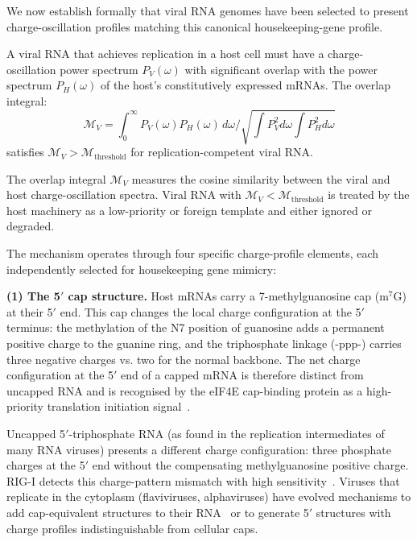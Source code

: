 We now establish formally that viral RNA genomes have been selected to present charge-oscillation profiles matching this canonical housekeeping-gene profile.

\begin{proposition}
\label{v:prop:mimicry}
A viral RNA that achieves replication in a host cell must have a charge-oscillation power spectrum $P_V(\omega)$ with significant overlap with the power spectrum $P_H(\omega)$ of the host's constitutively expressed mRNAs. The overlap integral:
\begin{equation}
  \mathcal{M}_V = \int_0^\infty P_V(\omega) P_H(\omega)\,d\omega \bigg/ \sqrt{\int P_V^2 d\omega \int P_H^2 d\omega}
  \label{v:eq:overlap}
\end{equation}
satisfies $\mathcal{M}_V > \mathcal{M}_{\mathrm{threshold}}$ for replication-competent viral RNA.
\end{proposition}

The overlap integral $\mathcal{M}_V$ measures the cosine similarity between the viral and host charge-oscillation spectra. Viral RNA with $\mathcal{M}_V < \mathcal{M}_{\mathrm{threshold}}$ is treated by the host machinery as a low-priority or foreign template and either ignored or degraded.

The mechanism operates through four specific charge-profile elements, each independently selected for housekeeping gene mimicry:

\textbf{(1) The 5$'$ cap structure.}
Host mRNAs carry a 7-methylguanosine cap (m$^7$G) at their 5$'$ end. This cap changes the local charge configuration at the 5$'$ terminus: the methylation of the N7 position of guanosine adds a permanent positive charge to the guanine ring, and the triphosphate linkage (-ppp-) carries three negative charges vs. two for the normal backbone. The net charge configuration at the 5$'$ end of a capped mRNA is therefore distinct from uncapped RNA and is recognised by the eIF4E cap-binding protein as a high-priority translation initiation signal~\cite{Sonenberg2009}.

Uncapped 5$'$-triphosphate RNA (as found in the replication intermediates of many RNA viruses) presents a different charge configuration: three phosphate charges at the 5$'$ end without the compensating methylguanosine positive charge. RIG-I detects this charge-pattern mismatch with high sensitivity~\cite{Hornung2006,Pichlmair2006}. Viruses that replicate in the cytoplasm (flaviviruses, alphaviruses) have evolved mechanisms to add cap-equivalent structures to their RNA~\cite{Dong2012} or to generate 5$'$ structures with charge profiles indistinguishable from cellular caps.


